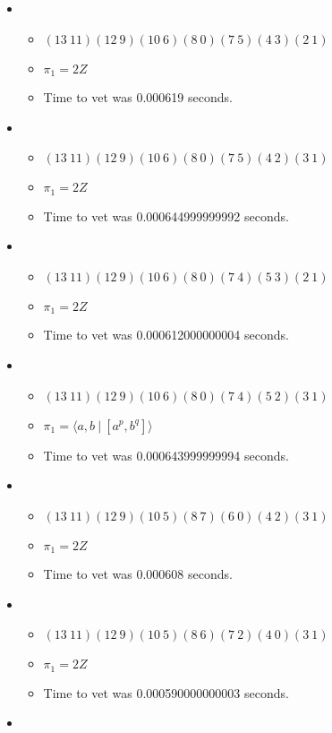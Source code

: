 \documentclass{article}
\begin{document}
\begin{itemize}
\item \begin{itemize}
      \item $(13\ 11)(12\ 9)(10\ 6)(8\ 0)(7\ 5)(4\ 3)(2\ 1)$
      \item $\pi_1 =2 Z$
      \item Time to vet was 0.000619 seconds.
\end{itemize}
\item \begin{itemize}
      \item $(13\ 11)(12\ 9)(10\ 6)(8\ 0)(7\ 5)(4\ 2)(3\ 1)$
      \item $\pi_1 =2 Z$
      \item Time to vet was 0.000644999999992 seconds.
\end{itemize}
\item \begin{itemize}
      \item $(13\ 11)(12\ 9)(10\ 6)(8\ 0)(7\ 4)(5\ 3)(2\ 1)$
      \item $\pi_1 =2 Z$
      \item Time to vet was 0.000612000000004 seconds.
\end{itemize}
\item \begin{itemize}
      \item $(13\ 11)(12\ 9)(10\ 6)(8\ 0)(7\ 4)(5\ 2)(3\ 1)$
      \item $\pi_1 = \langle a,b\ |\ [a^p,b^q]\rangle$
      \item Time to vet was 0.000643999999994 seconds.
\end{itemize}
\item \begin{itemize}
      \item $(13\ 11)(12\ 9)(10\ 5)(8\ 7)(6\ 0)(4\ 2)(3\ 1)$
      \item $\pi_1 =2 Z$
      \item Time to vet was 0.000608 seconds.
\end{itemize}
\item \begin{itemize}
      \item $(13\ 11)(12\ 9)(10\ 5)(8\ 6)(7\ 2)(4\ 0)(3\ 1)$
      \item $\pi_1 =2 Z$
      \item Time to vet was 0.000590000000003 seconds.
\end{itemize}
\item \begin{itemize}

\end{itemize}
\end{itemize}
\end{document}
